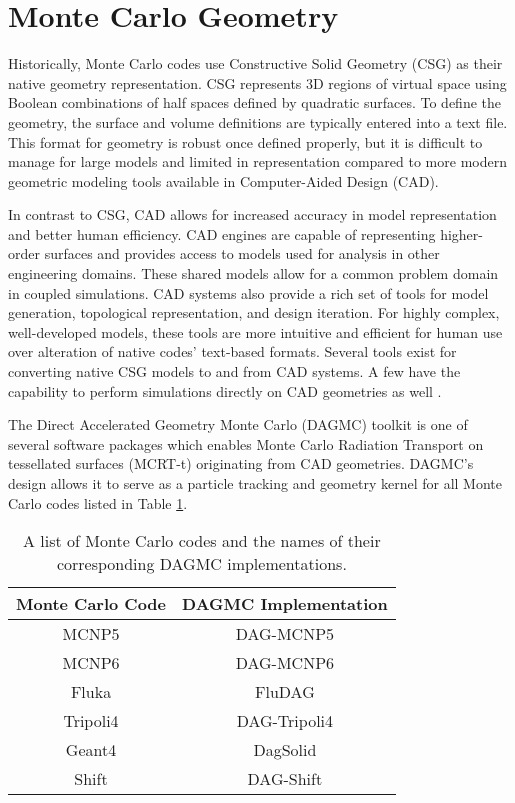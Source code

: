 \section{Monte Carlo Geometry}


Historically, Monte Carlo codes use Constructive Solid Geometry (CSG) as their
native geometry representation. CSG represents 3D regions of virtual
space using Boolean combinations of half spaces defined by quadratic
surfaces. To define the geometry, the surface and volume definitions are typically entered
into a text file. This format for geometry is robust once defined properly, but it is difficult to manage for large models and
limited in representation compared to more modern geometric modeling tools
available in Computer-Aided Design (CAD).

In contrast to CSG, CAD allows for increased accuracy in model representation and better human
efficiency. CAD engines are capable of representing higher-order surfaces and provides access
to models used for analysis in other engineering domains. These shared models
allow for a common problem domain in coupled simulations. CAD systems also
provide a rich set of tools for model generation, topological representation,
and design iteration. For highly complex, well-developed models, these tools are
more intuitive and efficient for human use over alteration of native codes' text-based
formats. Several tools exist for converting native CSG models to and from CAD
systems. A few have the capability to perform simulations directly on CAD
geometries as well \cite{Leppanen_2015}.

The Direct Accelerated Geometry Monte Carlo (DAGMC) \cite{Tautges_2009} toolkit
is one of several software packages which enables Monte Carlo Radiation
Transport on tessellated surfaces (MCRT-t) originating from CAD
geometries. DAGMC's design allows it to serve as a particle tracking and
geometry kernel for all Monte Carlo codes listed in Table
\ref{tab:dagmc_implementations}.

\begin{table}[H]
  \centering
  \begin{tabular}{c c}
    \hline
    Monte Carlo Code & DAGMC Implementation \\
    \hline
    MCNP5\cite{LANL_MCNP5_VOLIII}            & DAG-MCNP5            \\
    MCNP6\cite{Goorley_2016}                 & DAG-MCNP6            \\
    Fluka\cite{Bohlen_2014}                  & FluDAG               \\
    Tripoli4\cite{Malouch_2017}              & DAG-Tripoli4         \\
    Geant4\cite{GEANT4_2003}                 & DagSolid             \\
    Shift\cite{Pandya_2016}                  & DAG-Shift            \\
    \hline
  \end{tabular}
  \caption[A list of Monte Carlo codes supported by DAGMC.]{A list of Monte Carlo codes and the names of their corresponding DAGMC implementations.}
  \label{tab:dagmc_implementations}
\end{table}

